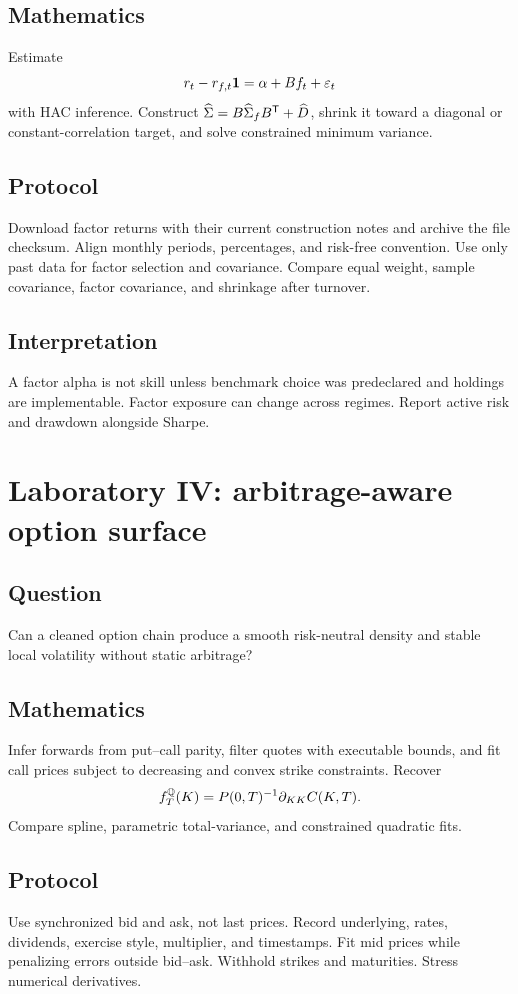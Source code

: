 \subsection*{Mathematics}
Estimate
\[
r_t-r_{f,t}\bm 1=\alpha+Bf_t+\varepsilon_t
\]
with HAC inference. Construct
$\widehat\Sigma=B\widehat\Sigma_fB^\mathsf T+\widehat D$, shrink it toward a
diagonal or constant-correlation target, and solve constrained minimum variance.

\subsection*{Protocol}
Download factor returns with their current construction notes and archive the file
checksum. Align monthly periods, percentages, and risk-free convention. Use only
past data for factor selection and covariance. Compare equal weight, sample
covariance, factor covariance, and shrinkage after turnover.

\subsection*{Interpretation}
A factor alpha is not skill unless benchmark choice was predeclared and holdings are
implementable. Factor exposure can change across regimes. Report active risk and
drawdown alongside Sharpe.

\section{Laboratory IV: arbitrage-aware option surface}

\subsection*{Question}
Can a cleaned option chain produce a smooth risk-neutral density and stable local
volatility without static arbitrage?

\subsection*{Mathematics}
Infer forwards from put--call parity, filter quotes with executable bounds, and fit
call prices subject to decreasing and convex strike constraints. Recover
\[
f^\mathbb Q_T(K)=P(0,T)^{-1}\partial_{KK}C(K,T).
\]
Compare spline, parametric total-variance, and constrained quadratic fits.

\subsection*{Protocol}
Use synchronized bid and ask, not last prices. Record underlying, rates, dividends,
exercise style, multiplier, and timestamps. Fit mid prices while penalizing errors
outside bid--ask. Withhold strikes and maturities. Stress numerical derivatives.

